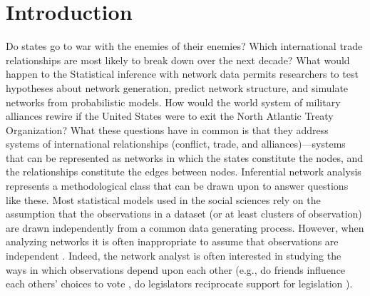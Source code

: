 \documentclass[fleqn,12pt]{wlscirep}
\title{\centering{Chapter 48 Outline\\
\large{Network Modeling: Estimation, Inference, Comparison, and Selection}
}}
{\centering
\author[1]{John P. Schoeneman}
\author[1]{Bruce A.  Desmarais}
\affil[1]{Penn State, Political Science, University Park, Pond Lab}
}
\begin{document}
\flushbottom
\maketitle{}
\vspace{-1.5cm}



\section{Introduction}

Do states go to war with the enemies of their enemies? Which international trade relationships are most likely to break down over the next decade? What would happen to the  Statistical inference with network data permits researchers to test hypotheses about network generation, predict network structure, and simulate networks from probabilistic models. How would the world system of military alliances rewire if the United States were to exit the North Atlantic Treaty Organization? What these questions have in common is that they  address systems of international relationships (conflict, trade, and alliances)---systems that can be represented as networks in which the states constitute the nodes, and the relationships constitute the edges between nodes. Inferential network analysis represents a methodological class that can be drawn upon to answer questions like these. Most statistical models used in the social sciences rely on the assumption that the observations in a dataset (or at least clusters of observation) are drawn independently from a common data generating process.  However, when analyzing networks it is often inappropriate to assume that observations are independent \citep{harris2013communication,hafner2009network}. Indeed, the network analyst is often interested in studying the ways in which observations depend upon each other \citep{ogburn2018challenges} (e.g., do friends influence each others' choices to vote \citep{bond201261}, do legislators reciprocate support for legislation \citep{kirkland2014partisanship}). 
\end{document}
